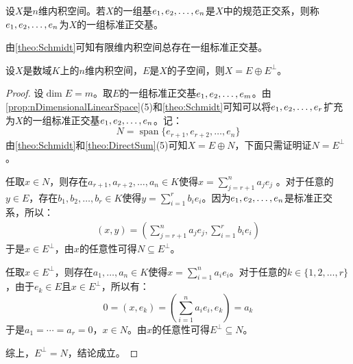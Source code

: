 \begin{definition}
	设$X$是$n$维内积空间。若$X$的一组基$e_1, e_2, \dots, e_{n}$是$X$中的规范正交系，则称$e_1, e_2, \dots, e_{n}$为$X$的一组标准正交基。
\end{definition}
\begin{note}
	由\cref{theo:Schmidt}可知有限维内积空间总存在一组标准正交基。
\end{note}
\begin{theorem}\label{theo:OrthogonalComplementDirectSum}
	设$X$是数域$K$上的$n$维内积空间，$E$是$X$的子空间，则$X=E\oplus E^\perp$。
\end{theorem}
\begin{proof}
	设$\dim E=m$。取$E$的一组标准正交基$e_1, e_2, \dots, e_{m}$。由\cref{prop:nDimensionalLinearSpace}(5)和\cref{theo:Schmidt}可知可以将$e_1, e_2, \dots, e_{r}$扩充为$X$的一组标准正交基$e_1, e_2, \dots, e_{n}$。记：
	\begin{equation*}
		N=\operatorname{span}\{e_{r+1},e_{r+2},\dots,e_n\}
	\end{equation*}
	由\cref{theo:Schmidt}和\cref{theo:DirectSum}(5)可知$X=E\oplus N$，下面只需证明证$N=E^\perp$。\par
	任取$x\in N$，则存在$a_{r+1},a_{r+2},\dots,a_n\in K$使得$x=\sum\limits_{j=r+1}^{n}a_je_j$
	。对于任意的$y\in E$，存在$b_1,b_2,\dots,b_r\in K$使得$y=\sum\limits_{i=1}^{r}b_ie_i$。因为$e_1, e_2, \dots, e_{n}$是标准正交系，所以：
	\begin{align*}
		(x,y)=\left(\sum_{j=r+1}^{n}a_je_j,\sum_{i=1}^{r}b_ie_i\right)
	\end{align*}
	于是$x\in E^\perp$，由$x$的任意性可得$N\subseteq E^\perp$。\par
	任取$x\in E^\perp$，则存在$a_1,\ldots,a_n\in K$使得$x=\sum_{i=1}^{n}a_ie_i$。对于任意的$k\in\{1,2,\dots,r\}$，由于$e_k\in E$且$x\in E^\perp$，所以有：
	\begin{equation*}
		0=(x,e_k)=\left(\sum_{i=1}^{n}a_ie_i,e_k\right)=a_k
	\end{equation*}
	于是$a_1=\cdots=a_r=0$，$x\in N$。由$x$的任意性可得$E^\perp\subseteq N$。\par
	综上，$E^{\perp}=N$，结论成立。
\end{proof}

